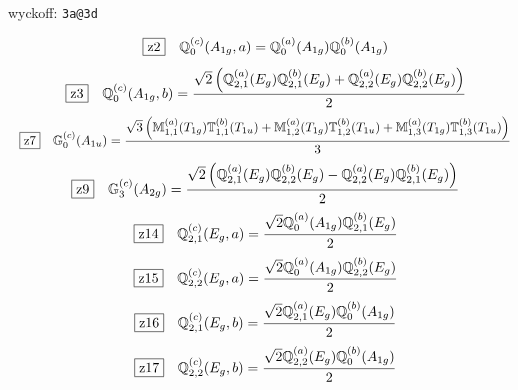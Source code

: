 \documentclass[fleqn,10pt,landscape]{jsarticle}
\begin{document}
\noindent\quad * wyckoff: \texttt{3a@3d}

\begin{dmath*}
\hspace*{3mm}\fbox{z2}\quad \mathbb{Q}_{0}^{(c)}(A_{1g},a)=\mathbb{Q}_{0}^{(a)}(A_{1g}) \mathbb{Q}_{0}^{(b)}(A_{1g})
\end{dmath*}
\begin{dmath*}
\hspace*{3mm}\fbox{z3}\quad \mathbb{Q}_{0}^{(c)}(A_{1g},b)=\frac{\sqrt{2} \left(\mathbb{Q}_{2,1}^{(a)}(E_{g}) \mathbb{Q}_{2,1}^{(b)}(E_{g}) + \mathbb{Q}_{2,2}^{(a)}(E_{g}) \mathbb{Q}_{2,2}^{(b)}(E_{g})\right)}{2}
\end{dmath*}
\begin{dmath*}
\hspace*{3mm}\fbox{z7}\quad \mathbb{G}_{0}^{(c)}(A_{1u})=\frac{\sqrt{3} \left(\mathbb{M}_{1,1}^{(a)}(T_{1g}) \mathbb{T}_{1,1}^{(b)}(T_{1u}) + \mathbb{M}_{1,2}^{(a)}(T_{1g}) \mathbb{T}_{1,2}^{(b)}(T_{1u}) + \mathbb{M}_{1,3}^{(a)}(T_{1g}) \mathbb{T}_{1,3}^{(b)}(T_{1u})\right)}{3}
\end{dmath*}
\begin{dmath*}
\hspace*{3mm}\fbox{z9}\quad \mathbb{G}_{3}^{(c)}(A_{2g})=\frac{\sqrt{2} \left(\mathbb{Q}_{2,1}^{(a)}(E_{g}) \mathbb{Q}_{2,2}^{(b)}(E_{g}) - \mathbb{Q}_{2,2}^{(a)}(E_{g}) \mathbb{Q}_{2,1}^{(b)}(E_{g})\right)}{2}
\end{dmath*}
\begin{dmath*}
\hspace*{3mm}\fbox{z14}\quad \mathbb{Q}_{2,1}^{(c)}(E_{g},a)=\frac{\sqrt{2} \mathbb{Q}_{0}^{(a)}(A_{1g}) \mathbb{Q}_{2,1}^{(b)}(E_{g})}{2}
\end{dmath*}
\begin{dmath*}
\hspace*{3mm}\fbox{z15}\quad \mathbb{Q}_{2,2}^{(c)}(E_{g},a)=\frac{\sqrt{2} \mathbb{Q}_{0}^{(a)}(A_{1g}) \mathbb{Q}_{2,2}^{(b)}(E_{g})}{2}
\end{dmath*}
\begin{dmath*}
\hspace*{3mm}\fbox{z16}\quad \mathbb{Q}_{2,1}^{(c)}(E_{g},b)=\frac{\sqrt{2} \mathbb{Q}_{2,1}^{(a)}(E_{g}) \mathbb{Q}_{0}^{(b)}(A_{1g})}{2}
\end{dmath*}
\begin{dmath*}
\hspace*{3mm}\fbox{z17}\quad \mathbb{Q}_{2,2}^{(c)}(E_{g},b)=\frac{\sqrt{2} \mathbb{Q}_{2,2}^{(a)}(E_{g}) \mathbb{Q}_{0}^{(b)}(A_{1g})}{2}
\end{dmath*}
\end{document}
